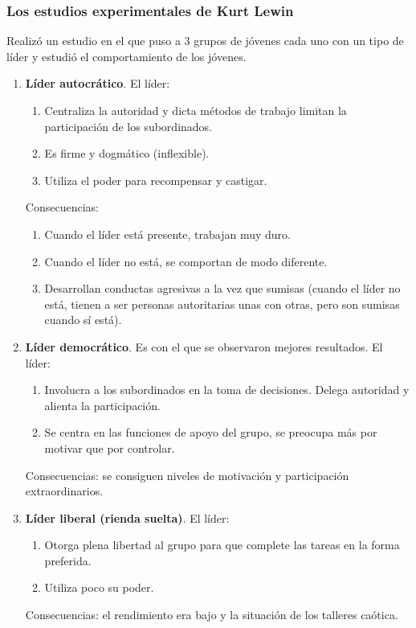 \documentclass[12pt]{article}
\theoremstyle{definition_wo_parentheses}
\begin{document}
\subsubsection{Los estudios experimentales de Kurt Lewin}
Realizó un estudio en el que puso a 3 grupos de jóvenes cada uno con un tipo de líder y estudió el comportamiento de los jóvenes.
\begin{enumerate}
\item \textbf{Líder autocrático}. El líder:
\begin{enumerate}
\item Centraliza la autoridad y dicta métodos de trabajo limitan la participación de los subordinados.
\item Es firme y dogmático (inflexible).
\item Utiliza el poder para recompensar y castigar.
\end{enumerate}
Consecuencias:
\begin{enumerate}
\item Cuando el líder está presente, trabajan muy duro.
\item Cuando el líder no está, se comportan de modo diferente.
\item Desarrollan conductas agresivas a la vez que sumisas (cuando el líder no está, tienen a ser personas autoritarias unas con otras, pero son sumisas cuando sí está).
\end{enumerate}
\item \textbf{Líder democrático}. Es con el que se observaron mejores resultados. El líder:
\begin{enumerate}
\item Involucra a los subordinados en la toma de decisiones. Delega autoridad y alienta la participación.
\item Se centra en las funciones de apoyo del grupo, se preocupa más por motivar que por controlar.
\end{enumerate}
Consecuencias: se consiguen niveles de motivación y participación extraordinarios.
\item \textbf{Líder liberal (rienda suelta)}. El líder:
\begin{enumerate}
\item Otorga plena libertad al grupo para que complete las tareas en la forma preferida.
\item Utiliza poco su poder.
\end{enumerate}
Consecuencias: el rendimiento era bajo y la situación de los talleres caótica.
\end{enumerate}
\end{document}
